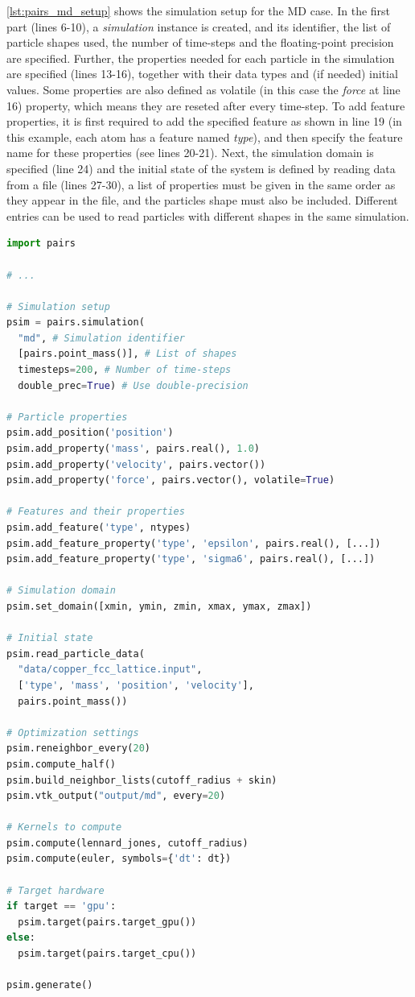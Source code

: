 \documentclass[Afour,sageh,times]{sagej}
\begin{document}
\autoref{lst:pairs_md_setup} shows the simulation setup for the \ac{MD} case. In the first part (lines 6-10), a \emph{simulation} instance is created, and its identifier, the list of particle shapes used, the number of time-steps and the floating-point precision are specified.
Further, the properties needed for each particle in the simulation are specified (lines 13-16), together with their data types and (if needed) initial values.
Some properties are also defined as volatile (in this case the \emph{force} at line 16) property, which means they are reseted after every time-step.
To add feature properties, it is first required to add the specified feature as shown in line 19 (in this example, each atom has a feature named \emph{type}), and then specify the feature name for these properties (see lines 20-21).
Next, the simulation domain is specified (line 24) and the initial state of the system is defined by reading data from a file (lines 27-30), a list of properties must be given in the same order as they appear in the file, and the particles shape must also be included.
Different entries can be used to read particles with different shapes in the same simulation.

\begin{lstlisting}[language=Python,
		   label={lst:pairs_md_setup},
		   caption={Simple example for MD simulation setup in P4IRS.}]
import pairs

# ...

# Simulation setup
psim = pairs.simulation(
  "md", # Simulation identifier
  [pairs.point_mass()], # List of shapes
  timesteps=200, # Number of time-steps
  double_prec=True) # Use double-precision

# Particle properties
psim.add_position('position')
psim.add_property('mass', pairs.real(), 1.0)
psim.add_property('velocity', pairs.vector())
psim.add_property('force', pairs.vector(), volatile=True)

# Features and their properties
psim.add_feature('type', ntypes)
psim.add_feature_property('type', 'epsilon', pairs.real(), [...])
psim.add_feature_property('type', 'sigma6', pairs.real(), [...])

# Simulation domain
psim.set_domain([xmin, ymin, zmin, xmax, ymax, zmax])

# Initial state
psim.read_particle_data(
  "data/copper_fcc_lattice.input",
  ['type', 'mass', 'position', 'velocity'],
  pairs.point_mass())

# Optimization settings
psim.reneighbor_every(20)
psim.compute_half()
psim.build_neighbor_lists(cutoff_radius + skin)
psim.vtk_output("output/md", every=20)

# Kernels to compute
psim.compute(lennard_jones, cutoff_radius)
psim.compute(euler, symbols={'dt': dt})

# Target hardware
if target == 'gpu':
  psim.target(pairs.target_gpu())
else:
  psim.target(pairs.target_cpu())

psim.generate()
\end{lstlisting}
\end{document}
